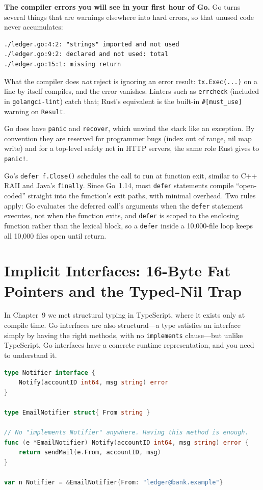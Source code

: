 \begin{trapbox}
\textbf{The compiler errors you will see in your first hour of Go.} Go turns several things that are warnings elsewhere into hard errors, so that unused code never accumulates:
\begin{lstlisting}[language=Plain]
./ledger.go:4:2: "strings" imported and not used
./ledger.go:9:2: declared and not used: total
./ledger.go:15:1: missing return
\end{lstlisting}
What the compiler does \emph{not} reject is ignoring an error result: \texttt{tx.Exec(...)} on a line by itself compiles, and the error vanishes. Linters such as \texttt{errcheck} (included in \texttt{golangci-lint}) catch that; Rust's equivalent is the built-in \texttt{\#[must\_use]} warning on \texttt{Result}.
\end{trapbox}

Go does have \texttt{panic} and \texttt{recover}, which unwind the stack like an exception. By convention they are reserved for programmer bugs (index out of range, nil map write) and for a top-level safety net in HTTP servers, the same role Rust gives to \texttt{panic!}.

Go's \texttt{defer f.Close()} schedules the call to run at function exit, similar to C++ RAII and Java's \texttt{finally}. Since Go~1.14, most \texttt{defer} statements compile ``open-coded'' straight into the function's exit paths, with minimal overhead. Two rules apply: Go evaluates the deferred call's arguments when the \texttt{defer} statement executes, not when the function exits, and \texttt{defer} is scoped to the enclosing function rather than the lexical block, so a \texttt{defer} inside a 10,000-file loop keeps all 10,000 files open until return.

\section{Implicit Interfaces: 16-Byte Fat Pointers and the Typed-Nil Trap}
\label{ch11:interfaces-itab}

In Chapter~9 we met structural typing in TypeScript, where it exists only at compile time. Go interfaces are also structural---a type satisfies an interface simply by having the right methods, with no \texttt{implements} clause---but unlike TypeScript, Go interfaces have a concrete runtime representation, and you need to understand it.

\begin{lstlisting}[language=Go]
type Notifier interface {
    Notify(accountID int64, msg string) error
}

type EmailNotifier struct{ From string }

// No "implements Notifier" anywhere. Having this method is enough.
func (e *EmailNotifier) Notify(accountID int64, msg string) error {
    return sendMail(e.From, accountID, msg)
}

var n Notifier = &EmailNotifier{From: "ledger@bank.example"}
\end{lstlisting}

